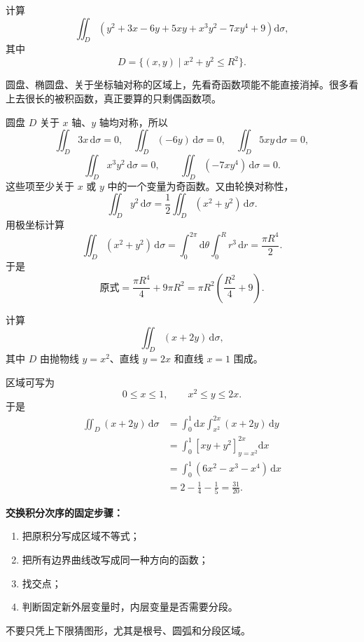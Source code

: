 \documentclass[answer,fontset=fandol]{THUExam}
\begin{document}
\begin{problem}
计算
\[
\iint_D\left(y^2+3x-6y+5xy+x^3y^2-7xy^4+9\right)\mathrm{d}\sigma,
\]
其中
\[
D=\{(x,y)\mid x^2+y^2\leqslant R^2\}.
\]
\end{problem}
\begin{note}
圆盘、椭圆盘、关于坐标轴对称的区域上，先看奇函数项能不能直接消掉。很多看上去很长的被积函数，真正要算的只剩偶函数项。
\end{note}
\begin{solution}
圆盘 $D$ 关于 $x$ 轴、$y$ 轴均对称，所以
\[
\iint_D3x\,\mathrm{d}\sigma=0,\quad
\iint_D(-6y)\,\mathrm{d}\sigma=0,\quad
\iint_D5xy\,\mathrm{d}\sigma=0,
\]
\[
\iint_Dx^3y^2\,\mathrm{d}\sigma=0,\qquad
\iint_D(-7xy^4)\,\mathrm{d}\sigma=0.
\]
这些项至少关于 $x$ 或 $y$ 中的一个变量为奇函数。又由轮换对称性，
\[
\iint_Dy^2\,\mathrm{d}\sigma
=\frac{1}{2}\iint_D(x^2+y^2)\,\mathrm{d}\sigma.
\]
用极坐标计算
\[
\iint_D(x^2+y^2)\,\mathrm{d}\sigma
=\int_0^{2\pi}\mathrm{d}\theta\int_0^Rr^3\,\mathrm{d}r
=\frac{\pi R^4}{2}.
\]
于是
\[
\text{原式}=\frac{\pi R^4}{4}+9\pi R^2
=\boxed{\pi R^2\left(\frac{R^2}{4}+9\right)}.
\]
\end{solution}
\bigskip

\begin{problem}
计算
\[
\iint_D (x+2y)\,\mathrm{d}\sigma,
\]
其中 $D$ 由抛物线 $y=x^2$、直线 $y=2x$ 和直线 $x=1$ 围成。
\end{problem}
\begin{solution}
区域可写为
\[
0\leqslant x\leqslant1,\qquad x^2\leqslant y\leqslant2x.
\]
于是
\begin{align*}
\iint_D(x+2y)\,\mathrm{d}\sigma
&=\int_0^1\mathrm{d}x\int_{x^2}^{2x}(x+2y)\,\mathrm{d}y\\
&=\int_0^1\left[x y+y^2\right]_{y=x^2}^{2x}\mathrm{d}x\\
&=\int_0^1(6x^2-x^3-x^4)\,\mathrm{d}x\\
&=2-\frac14-\frac15
=\boxed{\frac{31}{20}}.
\end{align*}
\end{solution}
\bigskip

\newpage
{}

\begin{note}
\textbf{交换积分次序的固定步骤：}
\begin{enumerate}
	\item 把原积分写成区域不等式；
	\item 把所有边界曲线改写成同一种方向的函数；
	\item 找交点；
	\item 判断固定新外层变量时，内层变量是否需要分段。
\end{enumerate}
不要只凭上下限猜图形，尤其是根号、圆弧和分段区域。
\end{note}
\bigskip
\end{document}
